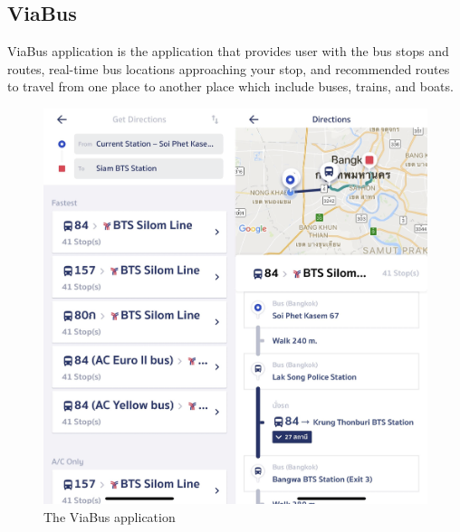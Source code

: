 \newpage
\subsection{ViaBus}
\par
ViaBus application is the application that provides user with the bus stops and routes, real-time bus locations approaching your stop, and recommended routes to travel from one place to another place which include buses, trains, and boats.
\begin{figure}[!h]
    \centering
    \includegraphics[width=0.5\linewidth]{chapter2/viabus.png}
    \caption{The ViaBus application}
    \label{fig:The ViaBus application}
\end{figure}

